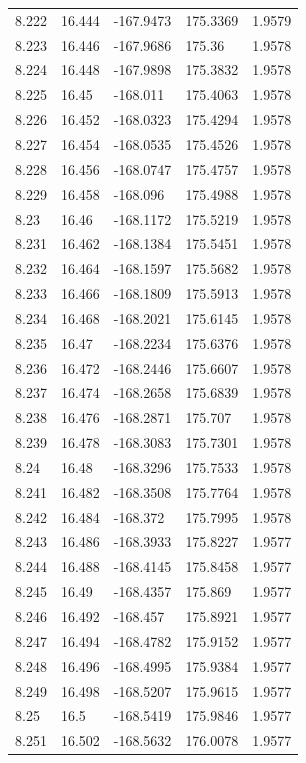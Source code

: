 \begin{tabular}{lllll}
8.222 & 16.444 & -167.9473 & 175.3369 & 1.9579 \\
8.223 & 16.446 & -167.9686 & 175.36 & 1.9578 \\
8.224 & 16.448 & -167.9898 & 175.3832 & 1.9578 \\
8.225 & 16.45 & -168.011 & 175.4063 & 1.9578 \\
8.226 & 16.452 & -168.0323 & 175.4294 & 1.9578 \\
8.227 & 16.454 & -168.0535 & 175.4526 & 1.9578 \\
8.228 & 16.456 & -168.0747 & 175.4757 & 1.9578 \\
8.229 & 16.458 & -168.096 & 175.4988 & 1.9578 \\
8.23 & 16.46 & -168.1172 & 175.5219 & 1.9578 \\
8.231 & 16.462 & -168.1384 & 175.5451 & 1.9578 \\
8.232 & 16.464 & -168.1597 & 175.5682 & 1.9578 \\
8.233 & 16.466 & -168.1809 & 175.5913 & 1.9578 \\
8.234 & 16.468 & -168.2021 & 175.6145 & 1.9578 \\
8.235 & 16.47 & -168.2234 & 175.6376 & 1.9578 \\
8.236 & 16.472 & -168.2446 & 175.6607 & 1.9578 \\
8.237 & 16.474 & -168.2658 & 175.6839 & 1.9578 \\
8.238 & 16.476 & -168.2871 & 175.707 & 1.9578 \\
8.239 & 16.478 & -168.3083 & 175.7301 & 1.9578 \\
8.24 & 16.48 & -168.3296 & 175.7533 & 1.9578 \\
8.241 & 16.482 & -168.3508 & 175.7764 & 1.9578 \\
8.242 & 16.484 & -168.372 & 175.7995 & 1.9578 \\
8.243 & 16.486 & -168.3933 & 175.8227 & 1.9577 \\
8.244 & 16.488 & -168.4145 & 175.8458 & 1.9577 \\
8.245 & 16.49 & -168.4357 & 175.869 & 1.9577 \\
8.246 & 16.492 & -168.457 & 175.8921 & 1.9577 \\
8.247 & 16.494 & -168.4782 & 175.9152 & 1.9577 \\
8.248 & 16.496 & -168.4995 & 175.9384 & 1.9577 \\
8.249 & 16.498 & -168.5207 & 175.9615 & 1.9577 \\
8.25 & 16.5 & -168.5419 & 175.9846 & 1.9577 \\
8.251 & 16.502 & -168.5632 & 176.0078 & 1.9577 \\

\end{tabular}
